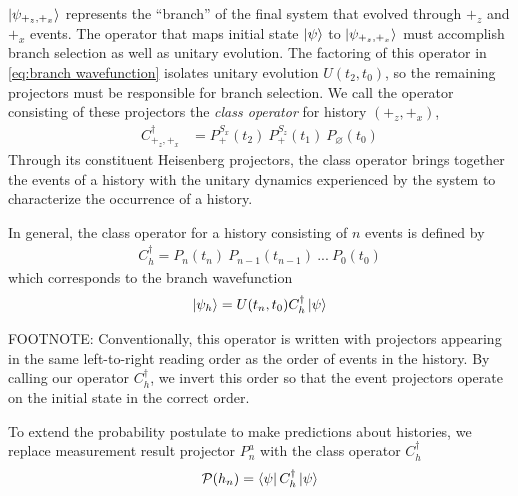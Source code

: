 $\ket{\psi_{+_z, +_x}}$ represents the ``branch'' of the final system that evolved through $+_z$ and $+_x$ events. The operator that maps initial state $\ket{\psi}$ to $\ket{\psi_{+_z, +_x}}$ must accomplish branch selection as well as unitary evolution. The factoring of this operator in \autoref{eq:branch wavefunction} isolates unitary evolution $U(t_2, t_0)$, so the remaining projectors must be responsible for branch selection. We call the operator consisting of these projectors the \textit{class operator} for history $\left(+_z, +_x\right)$,
\begin{align}
    C^\dagger_{+_z, +_x} &= {P^{S_x}_+(t_2)} \: {P^{S_z}_+(t_1)} \: {P_\varnothing(t_0)}
\end{align}
Through its constituent Heisenberg projectors, the class operator brings together the events of a history with the unitary dynamics experienced by the system to characterize the occurrence of a history.

In general, the class operator for a history consisting of $n$ events is defined by
\begin{align}
  C_h^\dagger = P_n(t_n) \: P_{n-1}(t_{n-1}) \: ... \: P_0(t_0)
\end{align}
which corresponds to the branch wavefunction
\begin{align}
  \ket{\psi_h} = U(t_n, t_0) C_h^\dagger \ket{\psi}
\end{align}

FOOTNOTE:
Conventionally, this operator is written with projectors appearing in the same left-to-right reading order as the order of events in the history. By calling our operator $C_h^\dagger$, we invert this order so that the event projectors operate on the initial state in the correct order.

To extend the probability postulate to make predictions about histories, we replace measurement result projector $P^a_n$ with the class operator $C_h^\dagger$
\begin{align} \label{eq:Extended Born Rule}
  \mathcal{P}(h_n) = \bra{\psi} C_h^\dagger \ket{\psi}
\end{align}


